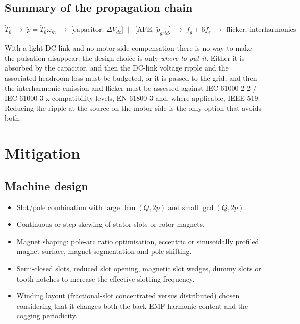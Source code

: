 \documentclass[11pt,a4paper]{article}
\begin{document}
\subsection{Summary of the propagation chain}

\begin{equation*}
\tilde{T}_{6}\;\rightarrow\;\tilde{p}=\tilde{T}_{6}\omega_{m}\;\rightarrow\;
\Big[\text{capacitor: }\Delta V_{dc}\Big]\;\Big\|\;\Big[\text{AFE: }\tilde{p}_{grid}\Big]
\;\rightarrow\; f_{g}\pm 6f_{e} \;\rightarrow\; \text{flicker, interharmonics}
\end{equation*}

With a light DC link and no motor-side compensation there is no way to make the
pulsation disappear: the design choice is only \emph{where to put it}. Either it
is absorbed by the capacitor, and then the DC-link voltage ripple and the
associated headroom loss must be budgeted, or it is passed to the grid, and then
the interharmonic emission and flicker must be assessed against IEC 61000-2-2 /
IEC 61000-3-x compatibility levels, EN 61800-3 and, where applicable,
IEEE 519. Reducing the ripple at the source on the motor side is the only option
that avoids both.

\section{Mitigation}

\subsection{Machine design}

\begin{itemize}
\item Slot/pole combination with large $\operatorname{lcm}(Q,2p)$ and small
      $\gcd(Q,2p)$.
\item Continuous or step skewing of stator slots or rotor magnets.
\item Magnet shaping: pole-arc ratio optimisation, eccentric or sinusoidally
      profiled magnet surface, magnet segmentation and pole shifting.
\item Semi-closed slots, reduced slot opening, magnetic slot wedges, dummy
      slots or tooth notches to increase the effective slotting frequency.
\item Winding layout (fractional-slot concentrated versus distributed) chosen
      considering that it changes both the back-EMF harmonic content and the
      cogging periodicity.
\end{itemize}
\end{document}
